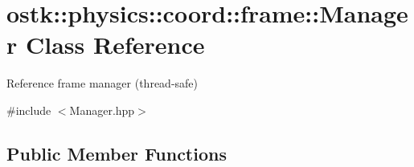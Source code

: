 \hypertarget{classostk_1_1physics_1_1coord_1_1frame_1_1_manager}{}\section{ostk\+:\+:physics\+:\+:coord\+:\+:frame\+:\+:Manager Class Reference}
\label{classostk_1_1physics_1_1coord_1_1frame_1_1_manager}


Reference frame manager (thread-\/safe)  




{\ttfamily \#include $<$Manager.\+hpp$>$}

\subsection*{Public Member Functions}
